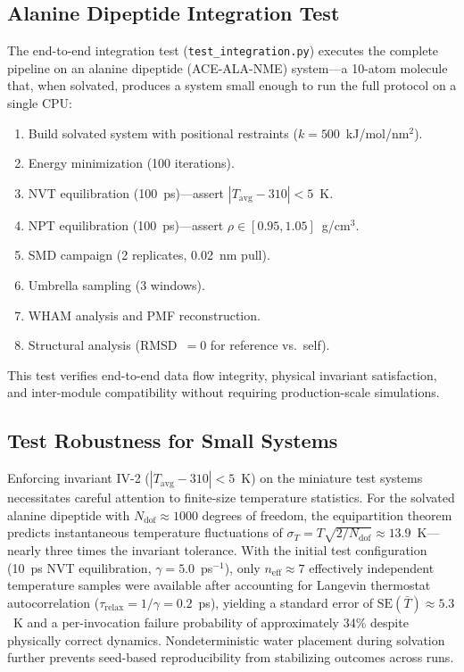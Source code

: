 \documentclass[conference]{IEEEtran}
\begin{document}
\subsection{Alanine Dipeptide Integration Test}

The end-to-end integration test (\texttt{test\_integration.py}) executes
the complete pipeline on an alanine dipeptide (ACE-ALA-NME)
system---a 10-atom molecule that, when solvated, produces a system small
enough to run the full protocol on a single CPU:

\begin{enumerate}
  \item Build solvated system with positional restraints
    ($k = 500$~kJ/mol/nm$^2$).
  \item Energy minimization (100 iterations).
  \item NVT equilibration (100~ps)---assert
    $|T_{\mathrm{avg}} - 310| < 5$~K.
  \item NPT equilibration (100~ps)---assert
    $\rho \in [0.95, 1.05]$~g/cm$^3$.
  \item SMD campaign (2 replicates, 0.02~nm pull).
  \item Umbrella sampling (3 windows).
  \item WHAM analysis and PMF reconstruction.
  \item Structural analysis (RMSD~$= 0$ for reference vs.\ self).
\end{enumerate}

This test verifies end-to-end data flow integrity, physical invariant
satisfaction, and inter-module compatibility without requiring
production-scale simulations.

\subsection{Test Robustness for Small Systems}\label{sec:test_robustness}

Enforcing invariant IV-2 ($|T_{\mathrm{avg}} - 310| < 5$~K) on the
miniature test systems necessitates careful attention to finite-size
temperature statistics.  For the solvated alanine dipeptide with
$N_{\mathrm{dof}} \approx 1000$ degrees of freedom, the equipartition
theorem predicts instantaneous temperature fluctuations of
$\sigma_T = T\sqrt{2/N_{\mathrm{dof}}} \approx 13.9$~K---nearly three
times the invariant tolerance.  With the initial test configuration
(10~ps NVT equilibration, $\gamma = 5.0$~ps$^{-1}$), only
$n_{\mathrm{eff}} \approx 7$ effectively independent temperature samples
were available after accounting for Langevin thermostat autocorrelation
($\tau_{\mathrm{relax}} = 1/\gamma = 0.2$~ps), yielding a standard error
of $\mathrm{SE}(\bar{T}) \approx 5.3$~K and a per-invocation failure
probability of approximately 34\% despite physically correct dynamics.
Nondeterministic water placement during solvation further prevents
seed-based reproducibility from stabilizing outcomes across runs.
\end{document}
